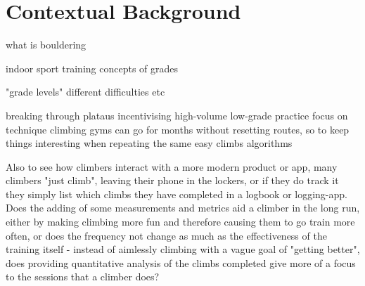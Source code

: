 \chapter{Contextual Background}
\label{chap:context}

%




what is bouldering

indoor sport
training
concepts of grades

"grade levels"
different difficulties etc








breaking through plataus
incentivising high-volume low-grade practice
focus on technique
climbing gyms can go for months without resetting routes, so to keep things interesting when repeating the same easy climbs algorithms

Also to see how climbers interact with a more modern product or app,
many climbers "just climb", leaving their phone in the lockers,
or if they do track it they simply list which climbs they have completed in a logbook or logging-app.
Does the adding of some measurements and metrics aid a climber in the long run,
either by making climbing more fun and therefore causing them to go train more often, or does the frequency not change as much as the effectiveness of the training itself - instead of aimlessly climbing with a vague goal of "getting better", does providing quantitative analysis of the climbs completed give more of a focus to the sessions that a climber does?






